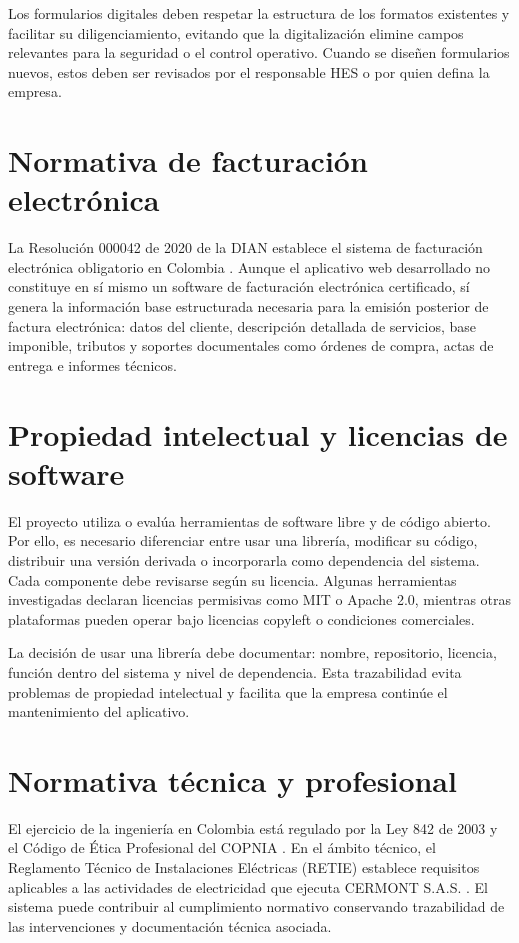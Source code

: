 Los formularios digitales deben respetar la estructura de los formatos existentes y facilitar su diligenciamiento, evitando que la digitalización elimine campos relevantes para la seguridad o el control operativo. Cuando se diseñen formularios nuevos, estos deben ser revisados por el responsable HES o por quien defina la empresa.

\section{Normativa de facturación electrónica}

La Resolución 000042 de 2020 de la DIAN establece el sistema de facturación electrónica obligatorio en Colombia \cite{dian2020}. Aunque el aplicativo web desarrollado no constituye en sí mismo un software de facturación electrónica certificado, sí genera la información base estructurada necesaria para la emisión posterior de factura electrónica: datos del cliente, descripción detallada de servicios, base imponible, tributos y soportes documentales como órdenes de compra, actas de entrega e informes técnicos.

\section{Propiedad intelectual y licencias de software}

El proyecto utiliza o evalúa herramientas de software libre y de código abierto. Por ello, es necesario diferenciar entre usar una librería, modificar su código, distribuir una versión derivada o incorporarla como dependencia del sistema. Cada componente debe revisarse según su licencia. Algunas herramientas investigadas declaran licencias permisivas como MIT o Apache 2.0, mientras otras plataformas pueden operar bajo licencias copyleft o condiciones comerciales.

La decisión de usar una librería debe documentar: nombre, repositorio, licencia, función dentro del sistema y nivel de dependencia. Esta trazabilidad evita problemas de propiedad intelectual y facilita que la empresa continúe el mantenimiento del aplicativo.

\section{Normativa técnica y profesional}

El ejercicio de la ingeniería en Colombia está regulado por la Ley 842 de 2003 y el Código de Ética Profesional del COPNIA \cite{ley842,copnia2021}. En el ámbito técnico, el Reglamento Técnico de Instalaciones Eléctricas (RETIE) establece requisitos aplicables a las actividades de electricidad que ejecuta CERMONT S.A.S. \cite{retie2013}. El sistema puede contribuir al cumplimiento normativo conservando trazabilidad de las intervenciones y documentación técnica asociada.


